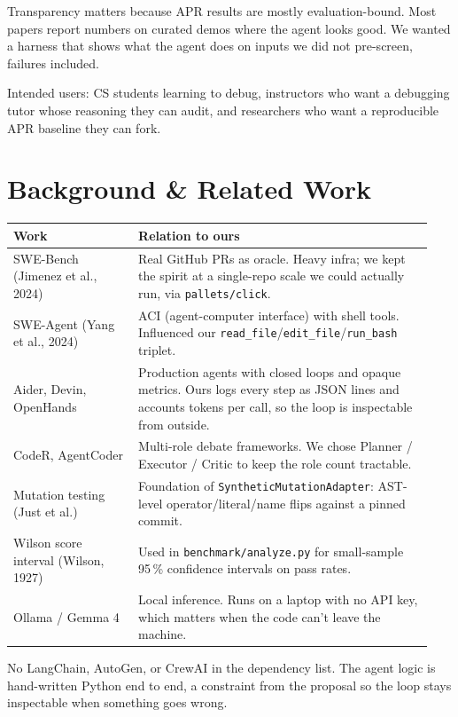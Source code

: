 \documentclass[11pt,letterpaper]{article}
\begin{document}
Transparency matters because APR results are mostly evaluation-bound. Most papers report numbers on curated demos where the agent looks good. We wanted a harness that shows what the agent does on inputs we did not pre-screen, failures included.

Intended users: CS students learning to debug, instructors who want a debugging tutor whose reasoning they can audit, and researchers who want a reproducible APR baseline they can fork.

\section{Background \& Related Work}

\begin{longtable}{p{0.28\linewidth} p{0.66\linewidth}}
\toprule
\textbf{Work} & \textbf{Relation to ours} \\
\midrule
\endhead
SWE-Bench (Jimenez et al., 2024) & Real GitHub PRs as oracle. Heavy infra; we kept the spirit at a single-repo scale we could actually run, via \texttt{pallets/click}. \\
SWE-Agent (Yang et al., 2024) & ACI (agent-computer interface) with shell tools. Influenced our \texttt{read\_file}/\texttt{edit\_file}/\texttt{run\_bash} triplet. \\
Aider, Devin, OpenHands & Production agents with closed loops and opaque metrics. Ours logs every step as JSON lines and accounts tokens per call, so the loop is inspectable from outside. \\
CodeR, AgentCoder & Multi-role debate frameworks. We chose Planner / Executor / Critic to keep the role count tractable. \\
Mutation testing (Just et al.) & Foundation of \texttt{SyntheticMutationAdapter}: AST-level operator/literal/name flips against a pinned commit. \\
Wilson score interval (Wilson, 1927) & Used in \texttt{benchmark/analyze.py} for small-sample 95\,\% confidence intervals on pass rates. \\
Ollama / Gemma 4 & Local inference. Runs on a laptop with no API key, which matters when the code can't leave the machine. \\
\bottomrule
\end{longtable}

No LangChain, AutoGen, or CrewAI in the dependency list. The agent logic is hand-written Python end to end, a constraint from the proposal so the loop stays inspectable when something goes wrong.
\end{document}
